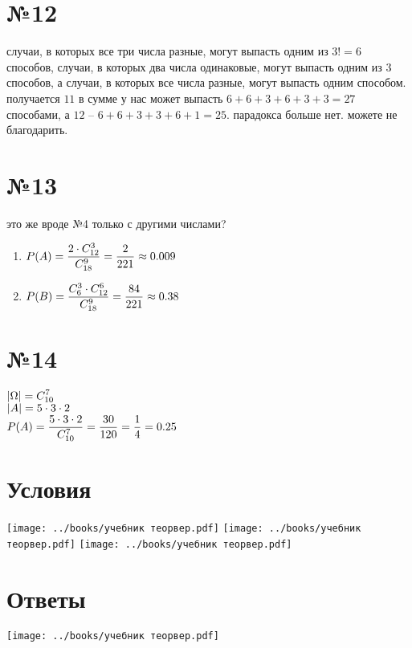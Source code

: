 \documentclass{article}
\newcommand{\hr}{\par\vspace{.5\baselineskip}\noindent\hrulefill\par}
\begin{document}
  \section*{№12}
  случаи, в которых все три числа разные, могут выпасть одним из $3! = 6$ способов,
  случаи, в которых два числа одинаковые, могут выпасть одним из $3$ способов,
  а случаи, в которых все числа разные, могут выпасть одним способом.
  получается $11$ в сумме у нас может выпасть $6+6+3+6+3+3=27$ способами,
  а $12$ -- $6+6+3+3+6+1=25$.
  парадокса больше нет. можете не благодарить.

  \section*{№13}
  это же вроде №4 только с другими числами?
  \begin{enumerate}[label=\realasbuk*)]
    \item $\displaystyle P(A) = \frac{2 \cdot C^3_{12}}{C^9_{18}} = \frac{2}{221} \approx 0.009 $
    \item $\displaystyle P(B) = \frac{C^3_6 \cdot C^6_{12}}{C^9_{18}} = \frac{84}{221} \approx 0.38 $
  \end{enumerate}

  \section*{№14}
  $\displaystyle \left|\Omega\right| = C^7_{10}$ \\
  $\displaystyle \left|A\right| = 5 \cdot 3 \cdot 2$ \\
  $\displaystyle P(A) = \frac{5 \cdot 3 \cdot 2}{C^7_{10}} = \frac{30}{120} = \frac{1}{4} = 0.25$

  \hr
  \section*{Условия}
  \texttt{[image: ../books/учебник теорвер.pdf]} \hfill
  \texttt{[image: ../books/учебник теорвер.pdf]} \hfill
  \texttt{[image: ../books/учебник теорвер.pdf]} \hfill

  \section*{Ответы}
  \texttt{[image: ../books/учебник теорвер.pdf]}
\end{document}
